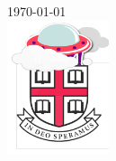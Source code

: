 \begin{titlepage}


{\large \today}\\[2cm] %


\includegraphics[width=3cm]{figure/logo.png}\\[1cm] %
 

\vfill %

\end{titlepage}








\begin{thebibliography}{9}

\end{thebibliography}
